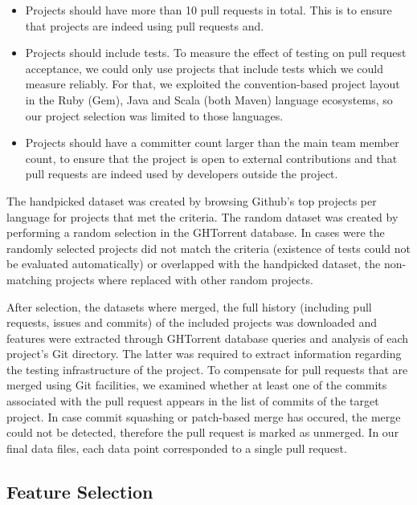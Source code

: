 \documentclass{sig-alternate}
\begin{document}
\begin{itemize}

  \item Projects should have more than 10 pull requests in total. This is
    to ensure that projects are indeed using pull requests and.

  \item Projects should include tests. To measure the effect of testing on pull
    request acceptance, we could only use projects that include tests which we
    could measure reliably. For that, we exploited the convention-based project
    layout in the Ruby (Gem), Java and Scala (both Maven) language ecosystems,
    so our project selection was limited to those languages. 

  \item Projects should have a committer count larger than the main team member
    count, to ensure that the project is open to external contributions and that
    pull requests are indeed used by developers outside the project.

\end{itemize}

The \textsf{handpicked} dataset was created by browsing Github's top projects
per language for projects that met the criteria. The \textsf{random} dataset
was created by performing a random selection in the GHTorrent database. In
cases were the randomly selected projects did not match the criteria (existence
of tests could not be evaluated automatically) or overlapped with the
\textsf{handpicked} dataset, the non-matching projects where replaced with
other random projects. 

After selection, the datasets where merged, the full
history (including pull requests, issues and commits) of the included projects
was downloaded and features were extracted through GHTorrent database
queries and analysis of each project's Git directory.
The latter was required to extract information regarding the testing 
infrastructure of the project.
To compensate for pull requests that are merged using Git facilities, 
we examined whether at least one of the commits associated with the pull
request appears in the list of commits of the target project. In case
commit squashing or patch-based merge has occured, the merge could not
be detected, therefore the pull request is marked as unmerged.
In our final data files,
each data point corresponded to a single pull request.

\subsection{Feature Selection}
\end{document}
